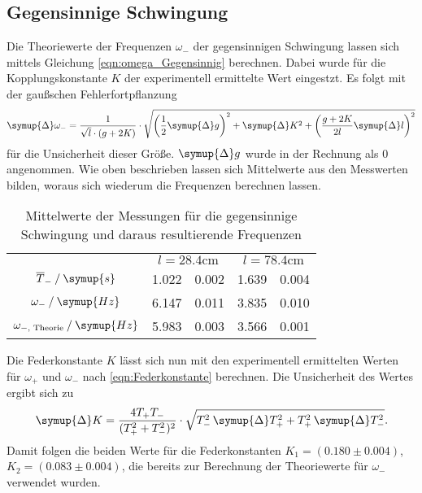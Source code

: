 \subsection{Gegensinnige Schwingung}
\label{subsec:Gegensinnig}
Die Theoriewerte der Frequenzen $\omega_-$ der gegensinnigen Schwingung lassen sich mittels Gleichung \eqref{eqn:omega_Gegensinnig} berechnen. Dabei wurde für die Kopplungskonstante $K$ 
der experimentell ermittelte Wert eingestzt. Es folgt mit der gaußschen Fehlerfortpflanzung
\begin{equation*}
    \label{eqn:DeltaOmegaMinus}
    \symup{\Delta}\omega_- = \frac{1}{\sqrt{l} \cdot (g + 2K)} \cdot \sqrt{\left(\frac{1}{2}\symup{\Delta}g\right)^2 + \symup{\Delta}K^2 + \left(\frac{g+2K}{2l}\symup{\Delta}l\right)^2}
\end{equation*}
für die Unsicherheit dieser Größe. $\symup{\Delta}g$ wurde in der Rechnung als $0$ angenommen. Wie oben beschrieben lassen sich Mittelwerte aus den Messwerten bilden,
woraus sich wiederum die Frequenzen berechnen lassen. 

\begin{table}
    \centering
    \caption{Mittelwerte der Messungen für die gegensinnige Schwingung und daraus resultierende Frequenzen}
    \begin{tabular}{c S @{${}\pm{}$} S S @{${}\pm{}$} S}
    \toprule
    &  &  \\
    \cmidrule(lr){2-3}\cmidrule(lr){4-5}
    {$\overline{T}_- \mathbin{/} \symup{s}$}                & 1.022 & 0.002 & 1.639 & 0.004 \\
    {$\omega_- \mathbin{/} \symup{Hz}$}                     & 6.147 & 0.011 & 3.835 & 0.010 \\
    {$\omega_{{-}\text{, Theorie}} \mathbin{/} \symup{Hz}$} & 5.983 & 0.003 & 3.566 & 0.001 \\
    \bottomrule
    \end{tabular}
\end{table}
Die Federkonstante $K$ lässt sich nun mit den experimentell ermittelten Werten für $\omega_+$ und $\omega_-$ nach \autoref{eqn:Federkonstante} berechnen.
Die Unsicherheit des Wertes ergibt sich zu
\begin{equation*}
    \label{eqn:DeltaK}
    \symup{\Delta}K = \frac{4T_+T_-}{(T_+^2 + T_-^2)^2} \cdot \sqrt{T_-^2 \, \symup{\Delta}T_+^2 + T_+^2 \, \symup{\Delta}T_-^2}.
\end{equation*}
Damit folgen die beiden Werte für die Federkonstanten $K_1 = (0.180 \pm 0.004)$, $K_2 = (0.083 \pm 0.004)$, die bereits zur Berechnung der Theoriewerte für $\omega_-$ verwendet wurden.

